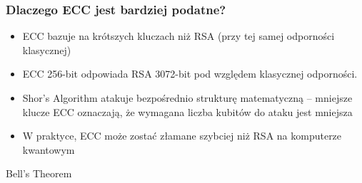 \begin{frame}
    \frametitle{Dlaczego ECC jest bardziej podatne?}
    \begin{itemize}
        \item ECC bazuje na krótszych kluczach niż RSA (przy tej samej odporności klasycznej)
        \item ECC 256-bit odpowiada RSA 3072-bit pod względem klasycznej odporności.
        \item Shor’s Algorithm atakuje bezpośrednio strukturę matematyczną – mniejsze klucze ECC oznaczają, że wymagana liczba kubitów do ataku jest mniejsza
        \item W praktyce, ECC może zostać złamane szybciej niż RSA na komputerze kwantowym
    \end{itemize}
\end{frame}






\begin{frame}{Bell's Theorem} %

\end{frame}

